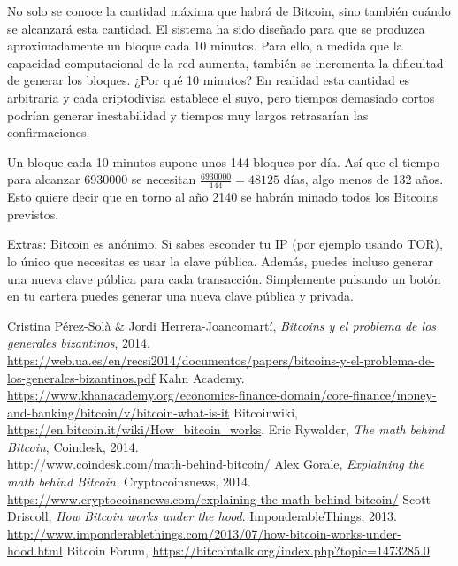 \documentclass[twoside]{article}
\theoremstyle{definition}
\begin{document}
No solo se conoce la cantidad máxima que habrá de Bitcoin, sino también cuándo se alcanzará esta cantidad. El sistema ha sido diseñado para que se produzca aproximadamente un bloque cada 10 minutos. Para ello, a medida que la capacidad computacional de la red aumenta, también se incrementa la dificultad de generar los bloques. ¿Por qué 10 minutos? En realidad esta cantidad es arbitraria y cada criptodivisa establece el suyo, pero tiempos demasiado cortos podrían generar inestabilidad y tiempos muy largos retrasarían las confirmaciones. 

Un bloque cada 10 minutos supone unos 144 bloques por día. Así que el tiempo para alcanzar 6930000 se necesitan $\frac{6930000}{144} = 48125$ días, algo menos de 132 años. Esto quiere decir que en torno al año 2140 se habrán minado todos los Bitcoins previstos.





\vspace{5cm}



Extras: Bitcoin es anónimo. Si sabes esconder tu IP (por ejemplo usando TOR), lo único que necesitas es usar la clave pública. Además, puedes incluso generar una nueva clave pública para cada transacción. Simplemente pulsando un botón en tu cartera puedes generar una nueva clave pública y privada.





\newpage
\begin{thebibliography}{}
 Cristina Pérez-Solà \& Jordi Herrera-Joancomartí, \textit{Bitcoins y el problema de los generales bizantinos}, 2014. \url{https://web.ua.es/en/recsi2014/documentos/papers/bitcoins-y-el-problema-de-los-generales-bizantinos.pdf}
 Kahn Academy. \url{https://www.khanacademy.org/economics-finance-domain/core-finance/money-and-banking/bitcoin/v/bitcoin-what-is-it}
 Bitcoinwiki, \url{https://en.bitcoin.it/wiki/How_bitcoin_works}.
 Eric Rywalder, \textit{The math behind Bitcoin}, Coindesk, 2014.\\ \url{http://www.coindesk.com/math-behind-bitcoin/}
 Alex Gorale, \textit{Explaining the math behind Bitcoin.} Cryptocoinsnews, 2014.\\ \url{https://www.cryptocoinsnews.com/explaining-the-math-behind-bitcoin/}
 Scott Driscoll, \textit{How Bitcoin works under the hood}. ImponderableThings, 2013. \url{http://www.imponderablethings.com/2013/07/how-bitcoin-works-under-hood.html}
 Bitcoin Forum, \url{https://bitcointalk.org/index.php?topic=1473285.0}
\end{thebibliography}
\end{document}
